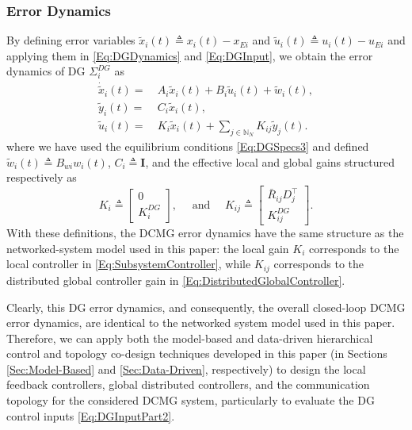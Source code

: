 \documentclass[letterpaper, 10 pt, conference]{ieeeconf}%
\newcommand{\N}{\mathbb{N}}
\newcommand{\T}{\top}
\newcommand{\I}{\mathbf{I}}
\newcommand{\0}{\mathbf{0}}
\newcommand{\bm}[1]{\begin{bmatrix}#1\end{bmatrix}}
\begin{document}
\subsubsection{\textbf{Error Dynamics}}
By defining error variables $\tilde{x}_i(t) \triangleq x_i(t) - x_{Ei}$ and $\tilde{u}_i(t) \triangleq u_i(t) - u_{Ei}$ and applying them in \eqref{Eq:DGDynamics} and \eqref{Eq:DGInput}, we obtain the error dynamics of DG $\Sigma_i^{DG}$ as
\begin{equation}\label{Eq:DGErrorDynamics}
\begin{aligned}
\dot{\tilde{x}}_i(t) =&\ A_i \tilde{x}_i(t) + B_i \tilde{u}_i(t) + \tilde{w}_i(t),\\
\tilde{y}_i(t) =&\ C_i \tilde{x}_i(t),\\
\tilde{u}_i(t) =&\ 
K_i \tilde{x}_i(t) + \sum_{j\in\N_N} K_{ij} \tilde{y}_j(t).
\end{aligned}
\end{equation}
where we have used the equilibrium conditions \eqref{Eq:DGSpecs3} and defined 
$\tilde{w}_i(t)\triangleq B_{wi}w_i(t)$, $C_i\triangleq\I$, and the effective local and global gains structured respectively as 
$$
K_i \triangleq \bm{0 \\ K_i^{DG}},
\quad \mbox{ and }\quad 
K_{ij} \triangleq \bm{\bar{R}_{ij}D_j^\T \\ K_{ij}^{DG}}.
$$ 
With these definitions, the DCMG error dynamics have the same structure as the networked-system model used in this paper: the local gain $K_i$ corresponds to the local controller in \eqref{Eq:SubsystemController}, while $K_{ij}$ corresponds to the distributed global controller gain in \eqref{Eq:DistributedGlobalController}.

Clearly, this DG error dynamics, and consequently, the overall closed-loop DCMG error dynamics, are identical to the networked system model used in this paper. Therefore, we can apply both the model-based and data-driven hierarchical control and topology co-design techniques developed in this paper (in Sections \ref{Sec:Model-Based} and \ref{Sec:Data-Driven}, respectively) to design the local feedback controllers, global distributed controllers, and the communication topology for the considered DCMG system, particularly to evaluate the DG control inputs \eqref{Eq:DGInputPart2}. 
\end{document}
